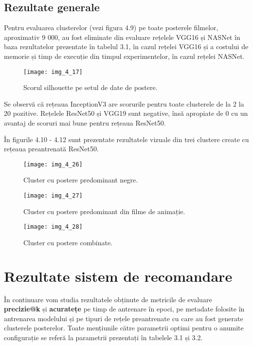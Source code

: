 \subsection{Rezultate generale}
Pentru evaluarea clusterelor (vezi figura 4.9) pe toate posterele filmelor, aproximativ 9 000, au fost eliminate din evaluare rețelele VGG16 și NASNet în baza rezultatelor prezentate în tabelul 3.1, în cazul rețelei VGG16 și a costului de memorie și timp de execuție din timpul experimentelor, în cazul rețelei NASNet.
\begin{figure}[!h]
	\centering
	\texttt{[image: img\_4\_17]}
	\caption[Scorul silhouette pe setul de date de postere]{Scorul silhouette pe setul de date de postere.}
\end{figure} 
Se observă că rețeaua InceptionV3 are scorurile pentru toate clusterele de la 2 la 20 pozitive. Rețelele ResNet50 și VGG19 sunt negative, însă apropiate de 0 cu un avantaj de scoruri mai bune pentru rețeaua ResNet50.

În figurile 4.10 - 4.12 sunt prezentate rezultatele vizuale din trei clustere create cu rețeaua preantrenată ResNet50.
\begin{figure}[!h]
	\centering
	\texttt{[image: img\_4\_26]}
	\caption[Cluster cu postere predominant negre]{Cluster cu postere predominant negre.}
\end{figure} 
\begin{figure}[!h]
	\centering
	\texttt{[image: img\_4\_27]}
	\caption[Cluster cu postere predominant din filme de animație]{Cluster cu postere predominant din filme de animație.}
\end{figure} 
\begin{figure}[!h]
	\centering
	\texttt{[image: img\_4\_28]}
	\caption[Cluster cu postere combinate]{Cluster cu postere combinate.}
\end{figure} 

\section{Rezultate sistem de recomandare}
În continuare vom studia rezultatele obținute de metricile de evaluare \textbf{precizie@k} și \textbf{acuratețe} pe timp de antrenare în epoci, pe metadate folosite în antrenarea modelului și pe tipuri de rețele preantrenate cu care au fost generate clusterele posterelor. Toate mențiunile către parametrii optimi pentru o anumite configurație se referă la parametrii prezentați în tabelele 3.1 și 3.2.

